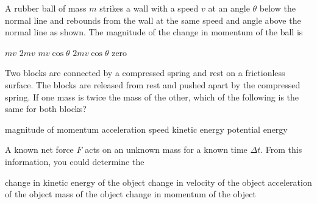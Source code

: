\documentclass{../../oss-apphys-exam}
\begin{document}
\begin{multicols*}{2}
\begin{questions}
    \question A rubber ball of mass $m$ strikes a wall with a speed $v$ at
    an angle $\theta$ below the normal line and rebounds from the wall at the
    same speed and angle above the normal line as shown. The magnitude of the
    change in momentum of the ball is
    \begin{center}
    \end{center}
    \begin{choices}
      \choice $mv$
      \choice $2mv$
      \choice $mv\cos\theta$
      \choice $2mv\cos\theta$
      \choice zero
    \end{choices}
    
    \question Two blocks are connected by a compressed spring and rest on a
    frictionless surface. The blocks are released from rest and pushed apart
    by the compressed spring. If one mass is twice the mass of the other,
    which of the following is the same for both blocks?
    \begin{choices}
      \choice magnitude of momentum
      \choice acceleration
      \choice speed
      \choice kinetic energy
      \choice potential energy
    \end{choices}
    \vspace{.7in}
    
    \question A known net force $F$ acts on an unknown mass for a known time
    $\Delta t$. From this information, you could determine the
    \begin{choices}
      \choice change in kinetic energy of the object
      \choice change in velocity of the object
      \choice acceleration of the object
      \choice mass of the object
      \choice change in momentum of the object
    \end{choices}
    \columnbreak
    

\end{questions}
\end{multicols*}
\end{document}
